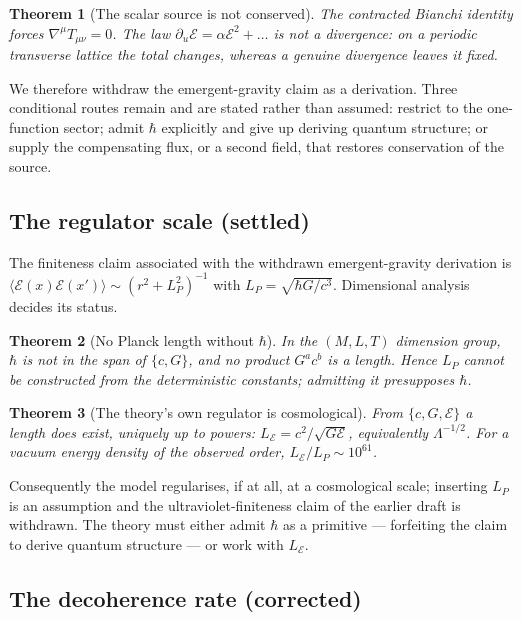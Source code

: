 \documentclass[aps,prd,twocolumn,superscriptaddress,nofootinbib]{revtex4-2}
\newcommand{\cE}{\mathcal{E}}
\newtheorem{theorem}{Theorem}
\begin{document}
\begin{theorem}[The scalar source is not conserved]\label{thm:M}
The contracted Bianchi identity forces $\nabla^\mu T_{\mu\nu}=0$. The law
$\partial_u\cE=\alpha\cE^2+\dots$ is not a divergence: on a periodic transverse
lattice the total changes, whereas a genuine divergence leaves it fixed.
\end{theorem}

We therefore withdraw the emergent-gravity claim as a derivation. Three
conditional routes remain and are stated rather than assumed: restrict to the
one-function sector; admit $\hbar$ explicitly and give up deriving quantum
structure; or supply the compensating flux, or a second field, that restores
conservation of the source.

\subsection{The regulator scale (settled)}

The finiteness claim associated with the withdrawn emergent-gravity derivation is
$\langle\cE(x)\cE(x')\rangle\sim(r^2+L_P^2)^{-1}$ with
$L_P=\sqrt{\hbar G/c^3}$. Dimensional analysis decides its status.

\begin{theorem}[No Planck length without $\hbar$]\label{thm:F}
In the $(M,L,T)$ dimension group, $\hbar$ is not in the span of $\{c,G\}$, and no
product $G^ac^b$ is a length. Hence $L_P$ cannot be constructed from the
deterministic constants; admitting it presupposes $\hbar$.
\end{theorem}

\begin{theorem}[The theory's own regulator is cosmological]\label{thm:G}
From $\{c,G,\cE\}$ a length does exist, uniquely up to powers:
$L_\cE=c^2/\sqrt{G\cE}$, equivalently $\Lambda^{-1/2}$. For a vacuum energy
density of the observed order, $L_\cE/L_P\sim10^{61}$.
\end{theorem}

Consequently the model regularises, if at all, at a cosmological scale;
inserting $L_P$ is an assumption and the ultraviolet-finiteness claim of the
earlier draft is withdrawn. The theory must either admit $\hbar$ as a primitive
--- forfeiting the claim to derive quantum structure --- or work with
$L_\cE$.

\subsection{The decoherence rate (corrected)}
\end{document}
